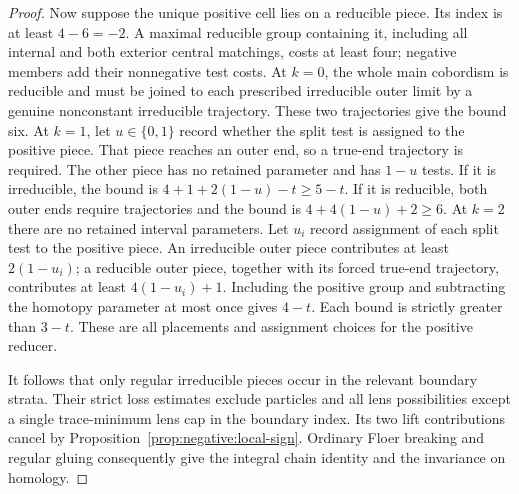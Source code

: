 \begin{proof}
Now suppose the unique positive cell lies on a reducible piece.
Its index is at least \(4-6=-2\).  A maximal reducible group
containing it, including all internal and both exterior central
matchings, costs at least four; negative members add their
nonnegative test costs.  At \(k=0\), the whole main cobordism is
reducible and must be joined to each prescribed irreducible outer
limit by a genuine nonconstant irreducible trajectory.  These two
trajectories give the bound six.  At \(k=1\), let \(u\in\{0,1\}\) record whether the split
test is assigned to the positive piece.  That piece reaches an outer
end, so a true-end trajectory is required.  The other piece has no
retained parameter and has \(1-u\) tests.  If it is irreducible,
the bound is \(4+1+2(1-u)-t\ge5-t\).  If it is reducible,
both outer ends require trajectories and the bound is
\(4+4(1-u)+2\ge6\).  At \(k=2\) there are no retained
interval parameters.  Let \(u_i\) record assignment of each split
test to the positive piece.  An irreducible outer piece contributes
at least \(2(1-u_i)\); a reducible outer piece, together with its
forced true-end trajectory, contributes at least \(4(1-u_i)+1\).
Including the positive group and subtracting the homotopy parameter
at most once gives \(4-t\).  Each bound is strictly greater than
\(3-t\).  These are all placements and assignment choices for
the positive reducer.

It follows that only regular irreducible pieces occur in the relevant
boundary strata.  Their strict loss estimates exclude particles and
all lens possibilities except a single trace-minimum lens cap in the
boundary index.  Its two lift contributions cancel by
Proposition~\ref{prop:negative:local-sign}.  Ordinary Floer breaking
and regular gluing consequently give the integral chain identity and
the invariance on homology.


\end{proof}
